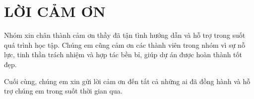 \chapter*{LỜI CẢM ƠN}

Nhóm xin chân thành cảm ơn thầy đã tận tình hướng dẫn và hỗ trợ trong suốt quá trình học tập. Chúng em cũng cảm ơn các thành viên trong nhóm vì sự nỗ lực, tinh thần trách nhiệm và hợp tác bền bỉ, giúp dự án được hoàn thành tốt đẹp.

Cuối cùng, chúng em xin gửi lời cảm ơn đến tất cả những ai đã đồng hành và hỗ trợ chúng em trong suốt thời gian qua.